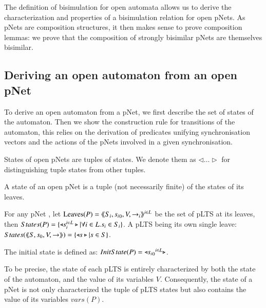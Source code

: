 \documentclass{elsarticle}
\newcommand{\LUDO}[1]{\textcolor{darkgreen}{#1}}
\begin{document}
The definition of bisimulation for open automata allows us to derive the characterization and properties of a
bisimulation relation for open pNets. As pNets are composition
structures, it then makes sense to prove composition lemmas: we prove
that the composition of strongly bisimilar pNets are themselves
bisimilar. 

\subsection{Deriving an open automaton from an open pNet}
To derive an open automaton from a pNet, we first describe the set of states of the automaton. Then we show the construction rule for transitions of the automaton, this  relies on the derivation of predicates unifying synchronisation vectors and the actions of the pNets involved in a given synchronisation.


States of open pNets are tuples of states. We denote them
 as $\triangleleft\ldots\triangleright$ for distinguishing tuple 
states from other tuples.
\begin{definition}\label{def-states}
  A state of an open pNet is a tuple (not necessarily finite) of the
  states of its leaves.

  For any pNet \pNet, let $\operatorname{Leaves}(P) = \langle\hspace{-0.45ex}\langle S_i,{s_i}_0,V, \to_i\rangle\hspace{-0.45ex}\rangle^{i \in L}$ be 
  the set of pLTS at its leaves,
  then $States(P) = \{\triangleleft s_i^{i\in L}
  \triangleright| \forall i\in L. s_i \in S_i\}$.
A pLTS being its own single leave:\\
  $States(\langle\hspace{-0.45ex}\langle S,s_0,V, \to\rangle\hspace{-0.45ex}\rangle) = \{\triangleleft s \triangleright| s \in S \}$.  

The initial state is defined as:
$InitState(P) = \triangleleft {{s_i}_0}^{i\in L}  \triangleright$.
\end{definition}
To be precise, the state of each pLTS is entirely characterized by both the state of the automaton, and the value of its variables $V$. Consequently, the state of a pNet is not only characterized the tuple of pLTS states but also contains the value of its variables $vars(P)$.
\end{document}

